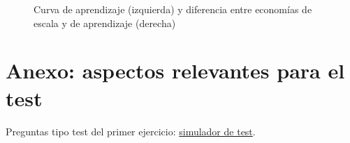 \documentclass[11pt]{article}
\begin{document}
\begin{figure}[H]
\centering
\caption{Curva de aprendizaje (izquierda) y diferencia entre economías de escala y de aprendizaje (derecha)}\label{fig:aprendizaje}
\end{figure}

\section{Anexo: aspectos relevantes para el test}\label{anexo:test}

\begin{anotaciones}
Preguntas tipo test del primer ejercicio: \href{https://www.victorgutierrezmarcos.es/oposicion/temario/primer-ejercicio/test/simulador.html?tema=3.A.12}{simulador de test}.
\end{anotaciones}
\end{document}
